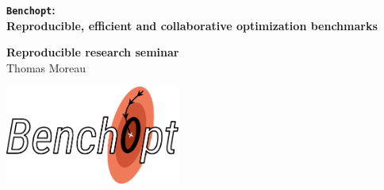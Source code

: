 \documentclass[unknownkeysallowed]{beamer}
\begin{document}


\begin{frame}
\bigskip
\bigskip
\begin{center}{
\LARGE\color{marron}
\textbf{\texttt{Benchopt}:\\
Reproducible, efficient and collaborative optimization benchmarks}
\textbf{ }\\
}

\color{marron}
\end{center}

\vspace{0.5cm}

\begin{center}
\textbf{Reproducible research seminar} \\
\vspace{0.1cm}
Thomas Moreau\\
\end{center}

\centering
\includegraphics[width=0.43\textwidth]{sharedimages/benchopt_logo.pdf}

\end{frame}
\end{document}
